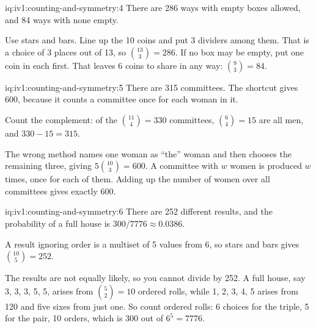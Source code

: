 \begin{solution}{iq:iv1:counting-and-symmetry:4}
There are 286 ways with empty boxes allowed, and 84 ways with none empty.

Use stars and bars. Line up the 10 coins and put 3 dividers among them. That is a choice of 3 places out of 13, so $\binom{13}{3} = 286$. If no box may be empty, put one coin in each first. That leaves 6 coins to share in any way: $\binom{9}{3} = 84$.

\end{solution}

\begin{solution}{iq:iv1:counting-and-symmetry:5}
There are 315 committees. The shortcut gives 600, because it counts a committee once for each woman in it.

Count the complement: of the $\binom{11}{4} = 330$ committees, $\binom{6}{4} = 15$ are all men, and $330 - 15 = 315$.

The wrong method names one woman as ``the'' woman and then chooses the remaining three, giving $5 \binom{10}{3} = 600$. A committee with $w$ women is produced $w$ times, once for each of them. Adding up the number of women over all committees gives exactly 600.

\end{solution}

\begin{solution}{iq:iv1:counting-and-symmetry:6}
There are 252 different results, and the probability of a full house is $300/7776 \approx 0.0386$.

A result ignoring order is a multiset of 5 values from 6, so stars and bars gives $\binom{10}{5} = 252$.

The results are not equally likely, so you cannot divide by 252. A full house, say 3, 3, 3, 5, 5, arises from $\binom{5}{2} = 10$ ordered rolls, while 1, 2, 3, 4, 5 arises from 120 and five sixes from just one. So count ordered rolls: 6 choices for the triple, 5 for the pair, 10 orders, which is 300 out of $6^5 = 7776$.

\end{solution}

